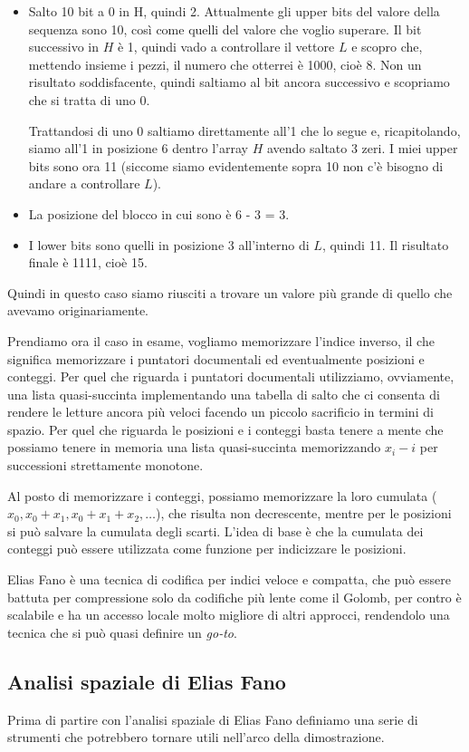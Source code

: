\begin{itemize}
    \item Salto 10 bit a 0 in H, quindi 2. Attualmente gli upper bits del valore della sequenza sono 10, così come quelli del valore che voglio superare. Il bit successivo in $H$ è 1, quindi vado a controllare il vettore $L$ e scopro che, mettendo insieme i pezzi, il numero che otterrei è 1000, cioè 8. Non un risultato soddisfacente, quindi saltiamo al bit ancora successivo e scopriamo che si tratta di uno 0.

    Trattandosi di uno 0 saltiamo direttamente all'1 che lo segue e, ricapitolando, siamo all'1 in posizione 6 dentro l'array $H$ avendo saltato 3 zeri. I miei upper bits sono ora 11 (siccome siamo evidentemente sopra 10 non c'è bisogno di andare a controllare $L$).
    \item La posizione del blocco in cui sono è 6 - 3 = 3.
    \item I lower bits sono quelli in posizione 3 all'interno di $L$, quindi 11. Il risultato finale è 1111, cioè 15.
\end{itemize}
Quindi in questo caso siamo riusciti a trovare un valore più grande di quello che avevamo originariamente.

Prendiamo ora il caso in esame, vogliamo memorizzare l'indice inverso, il che significa memorizzare i puntatori documentali ed eventualmente posizioni e conteggi. Per quel che riguarda i puntatori documentali utilizziamo, ovviamente, una lista quasi-succinta implementando una tabella di salto che ci consenta di rendere le letture ancora più veloci facendo un piccolo sacrificio in termini di spazio. Per quel che riguarda le posizioni e i conteggi basta tenere a mente che possiamo tenere in memoria una lista quasi-succinta memorizzando $x_i - i$  per successioni strettamente monotone.

Al posto di memorizzare i conteggi, possiamo memorizzare la loro cumulata ($x_0, x_0 + x_1, x_0 + x_1 + x_2, \dots$), che risulta non decrescente, mentre per le posizioni si può salvare la cumulata degli scarti. L'idea di base è che la cumulata dei conteggi può essere utilizzata come funzione per indicizzare le posizioni.

Elias Fano è una tecnica di codifica per indici veloce e compatta, che può essere battuta per compressione solo da codifiche più lente come il Golomb, per contro è scalabile e ha un accesso locale molto migliore di altri approcci, rendendolo una tecnica che si può quasi definire un \textit{go-to}.
\subsection{Analisi spaziale di Elias Fano}
Prima di partire con l'analisi spaziale di Elias Fano definiamo una serie di strumenti che potrebbero tornare utili nell'arco della dimostrazione.

